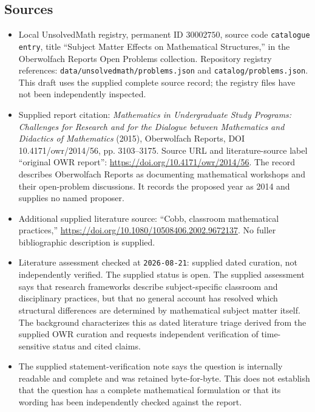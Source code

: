 \documentclass[11pt]{article}
\begin{document}
\subsection{Sources}
\begin{itemize}
\item Local UnsolvedMath registry, permanent ID \(30002750\), source code \texttt{catalogue entry}, title ``Subject Matter Effects on Mathematical Structures,'' in the Oberwolfach Reports Open Problems collection. Repository registry references: \texttt{data/unsolvedmath/problems.json} and \texttt{catalog/problems.json}. This draft uses the supplied complete source record; the registry files have not been independently inspected.
\item Supplied report citation: \emph{Mathematics in Undergraduate Study Programs: Challenges for Research and for the Dialogue between Mathematics and Didactics of Mathematics} (2015), Oberwolfach Reports, DOI 10.4171/owr/2014/56, pp. 3103--3175. Source URL and literature-source label ``original OWR report'': \url{https://doi.org/10.4171/owr/2014/56}. The record describes Oberwolfach Reports as documenting mathematical workshops and their open-problem discussions. It records the proposed year as 2014 and supplies no named proposer.
\item Additional supplied literature source: ``Cobb, classroom mathematical practices,'' \url{https://doi.org/10.1080/10508406.2002.9672137}. No fuller bibliographic description is supplied.
\item Literature assessment checked at \texttt{2026-08-21}: supplied dated curation, not independently verified. The supplied status is open. The supplied assessment says that research frameworks describe subject-specific classroom and disciplinary practices, but that no general account has resolved which structural differences are determined by mathematical subject matter itself. The background characterizes this as dated literature triage derived from the supplied OWR curation and requests independent verification of time-sensitive status and cited claims.
\item The supplied statement-verification note says the question is internally readable and complete and was retained byte-for-byte. This does not establish that the question has a complete mathematical formulation or that its wording has been independently checked against the report.
\end{itemize}
\end{document}
